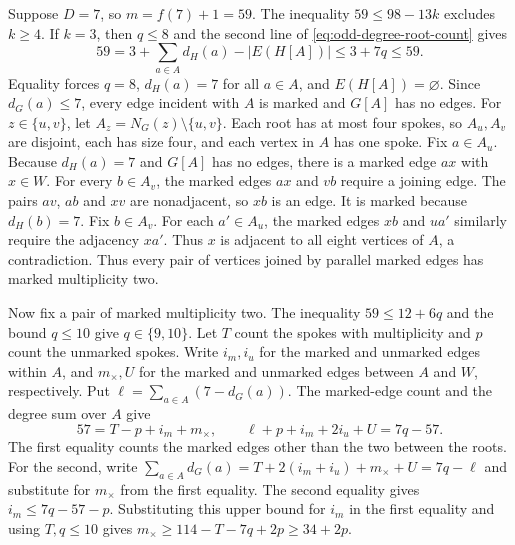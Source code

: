 \documentclass[preprint,11pt,numbers]{elsarticle-arxiv}
\numberwithin{equation}{section}
\theoremstyle{definition}
\begin{document}
Suppose $D=7$, so $m=f(7)+1=59$. The inequality
$59\leq98-13k$ excludes $k\geq4$. If $k=3$, then $q\leq8$ and
the second line of \eqref{eq:odd-degree-root-count} gives
\[
 59=3+\sum_{a\in A}d_H(a)-|E(H[A])|\leq3+7q\leq59.
\]
Equality forces $q=8$, $d_H(a)=7$ for all $a\in A$, and
$E(H[A])=\varnothing$. Since $d_G(a)\leq7$, every edge
incident with $A$ is marked and $G[A]$ has no edges. For
$z\in\{u,v\}$, let $A_z=N_G(z)\setminus\{u,v\}$. Each root
has at most four spokes, so $A_u,A_v$ are disjoint, each has
size four, and each vertex in $A$ has one spoke. Fix
$a\in A_u$. Because $d_H(a)=7$ and $G[A]$ has no edges, there
is a marked edge $ax$ with $x\in W$. For every $b\in A_v$,
the marked edges $ax$ and $vb$ require a joining edge. The
pairs $av$, $ab$ and $xv$ are nonadjacent, so $xb$ is an edge.
It is marked because $d_H(b)=7$. Fix $b\in A_v$. For each
$a'\in A_u$, the marked edges $xb$ and $ua'$ similarly
require the adjacency $xa'$. Thus $x$ is adjacent to all
eight vertices of $A$, a contradiction.
Thus every pair of vertices joined by parallel marked edges
has marked multiplicity two.

Now fix a pair of marked multiplicity two. The inequality
$59\leq12+6q$ and the bound $q\leq10$ give $q\in\{9,10\}$.
Let $T$ count the spokes with multiplicity and $p$ count the
unmarked spokes. Write $i_m,i_u$ for the marked and unmarked
edges within $A$, and $m_\times,U$ for the marked and unmarked
edges between $A$ and $W$, respectively. Put
$\ell=\sum_{a\in A}(7-d_G(a))$. The marked-edge count and the
degree sum over $A$ give
\[
 57=T-p+i_m+m_\times,\qquad
 \ell+p+i_m+2i_u+U=7q-57.
\]
The first equality counts the marked edges other than the two
between the roots. For the second, write
$\sum_{a\in A}d_G(a)=T+2(i_m+i_u)+m_\times+U=7q-\ell$
and substitute for $m_\times$ from the first equality.
The second equality gives $i_m\leq7q-57-p$. Substituting
this upper bound for $i_m$ in the first equality and using
$T,q\leq10$ gives $m_\times\geq114-T-7q+2p\geq34+2p$.
\end{document}
